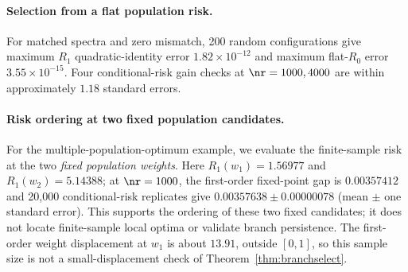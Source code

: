\paragraph{Selection from a flat population risk.}
For matched spectra and zero mismatch, 200 random configurations give maximum $R_1$ quadratic-identity error $1.82\times10^{-12}$ and maximum flat-$R_0$ error $3.55\times10^{-15}$. Four conditional-risk gain checks at $\nr=1000,4000$ are within approximately $1.18$ standard errors.

\paragraph{Risk ordering at two fixed population candidates.}
For the multiple-population-optimum example, we evaluate the finite-sample risk at the two \emph{fixed population weights}. Here $R_1(w_1)=1.56977$ and $R_1(w_2)=5.14388$; at $\nr=1000$, the first-order fixed-point gap is $0.00357412$ and 20{,}000 conditional-risk replicates give $0.00357638\pm0.00000078$ (mean $\pm$ one standard error). This supports the ordering of these two fixed candidates; it does not locate finite-sample local optima or validate branch persistence. The first-order weight displacement at $w_1$ is about $13.91$, outside $[0,1]$, so this sample size is not a small-displacement check of Theorem~\ref{thm:branchselect}.
